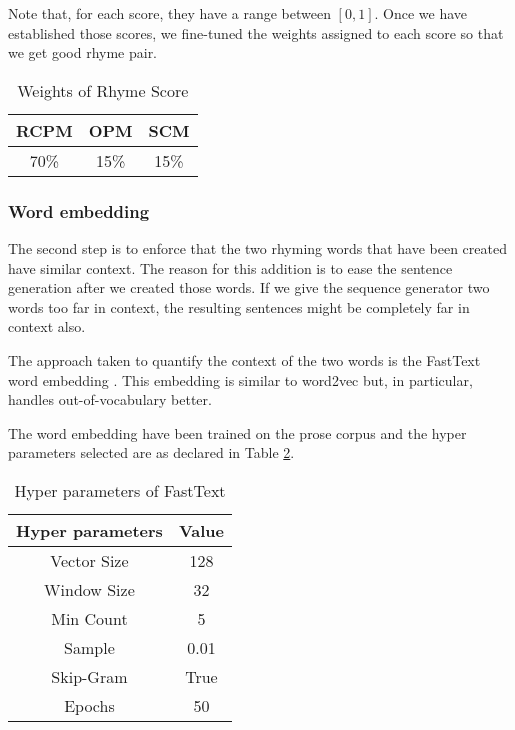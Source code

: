 \documentclass[11pt,a4paper]{article}
\begin{document}
Note that, for each score, they have a range between $[ 0, 1]$. Once we have established those scores, we fine-tuned the weights assigned to each score so that we get good rhyme pair.
\begin{table}[ht]
\centering
\begin{tabular}{c c c}
	\hline\hline
	RCPM & OPM & SCM \\ [0.5ex]
	\hline
	70\% & 15\% & 15\% \\ [0.5ex]
	\hline
\end{tabular}
\caption{Weights of Rhyme Score}
\label{table:weight_rhyme_score}
\end{table}

\subsubsection{Word embedding}
\label{sec:fasttext}
The second step is to enforce that the two rhyming words that have been created have similar context. The reason for this addition is to ease the sentence generation after we created those words. If we give the sequence generator two words too far in context, the resulting sentences might be completely far in context also. 

The approach taken to quantify the context of the two words is the FastText word embedding \cite{fasttext}. This embedding is similar to word2vec \cite{wordvec} but, in particular, handles out-of-vocabulary better.

The word embedding have been trained on the prose corpus and the hyper parameters selected are as declared in Table \ref{table:HP_fasttext}.
\begin{table}[ht]
\centering
\begin{tabular}{c c}
	\hline\hline
	Hyper parameters & Value \\ [0.5ex]
	\hline
	Vector Size & 128 \\ [0.5ex]
	Window Size & 32 \\ [0.5ex]
	Min Count & 5 \\ [0.5ex]
	Sample & 0.01\\ [0.5ex]
	Skip-Gram & True\\ [0.5ex]
	Epochs  & 50\\ [0.5ex]
	\hline
\end{tabular}
\caption{Hyper parameters of FastText}
\label{table:HP_fasttext}
\end{table}
\end{document}

